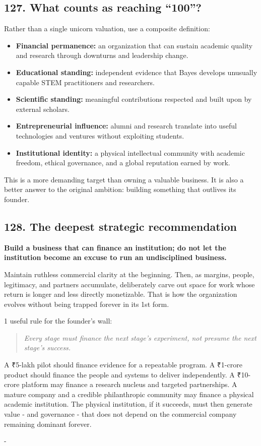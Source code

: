 \subsection{127. What counts as reaching ``100''?}

Rather than a single unicorn valuation, use a composite definition:

\begin{itemize}[leftmargin=*,itemsep=1.5pt]
  \item \textbf{Financial permanence:} an organization that can sustain academic quality and research through downturns and leadership change.
  \item \textbf{Educational standing:} independent evidence that Bayes develops unusually capable STEM practitioners and researchers.
  \item \textbf{Scientific standing:} meaningful contributions respected and built upon by external scholars.
  \item \textbf{Entrepreneurial influence:} alumni and research translate into useful technologies and ventures without exploiting students.
  \item \textbf{Institutional identity:} a physical intellectual community with academic freedom, ethical governance, and a global reputation earned by work.
\end{itemize}

This is a more demanding target than owning a valuable business. It is also a better answer to the original ambition: building something that outlives its founder.

\subsection{128. The deepest strategic recommendation}

\textbf{Build a business that can finance an institution; do not let the institution become an excuse to run an undisciplined business.}

Maintain ruthless commercial clarity at the beginning. Then, as margins, people, legitimacy, and partners accumulate, deliberately carve out space for work whose return is longer and less directly monetizable. That is how the organization evolves without being trapped forever in its 1st form.

1 useful rule for the founder's wall:

\begin{quote}\itshape
Every stage must finance the next stage's experiment, not presume the next stage's success.
\end{quote}
A \textnormal{₹}5-lakh pilot should finance evidence for a repeatable program. A \textnormal{₹}1-crore product should finance the people and systems to deliver independently. A \textnormal{₹}10-crore platform may finance a research nucleus and targeted partnerships. A mature company and a credible philanthropic community may finance a physical academic institution. The physical institution, if it succeeds, must then generate value - and governance - that does not depend on the commercial company remaining dominant forever.

-


